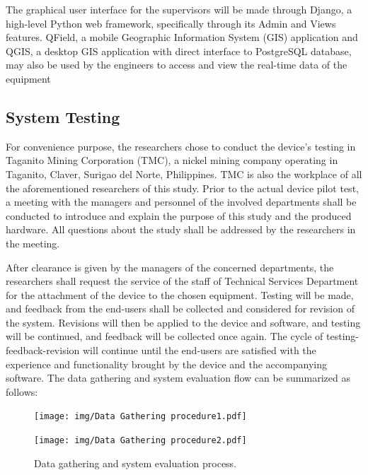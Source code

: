 \documentclass[12pt]{report}
\begin{document}
The graphical user interface for the supervisors will be made through Django, a high-level Python web framework, specifically through its Admin and Views features.
QField, a mobile Geographic Information System (GIS) application and QGIS, a desktop GIS application with direct interface to PostgreSQL database, may also be used by the engineers to access and view the real-time data of the equipment 

\subsection{System Testing}

For convenience purpose, the researchers chose to conduct the device's testing in Taganito Mining Corporation (TMC), a nickel mining company operating in Taganito, Claver, Surigao del Norte, Philippines.
TMC is also the workplace of all the aforementioned researchers of this study. 
Prior to the actual device pilot test, a meeting with the managers and personnel of the involved departments shall be conducted to introduce and explain the purpose of this study and the produced hardware. 
All questions about the study shall be addressed by the researchers in the meeting.

After clearance is given by the managers of the concerned departments, the researchers shall request the service of the staff of Technical Services Department for the attachment of the device to the chosen equipment.
Testing will be made, and feedback from the end-users shall be collected and considered for revision of the system.
Revisions will then be applied to the device and software, and testing will be continued, and feedback will be collected once again.
The cycle of testing-feedback-revision will continue until the end-users are satisfied with the experience and functionality brought by the device and the accompanying software.
The data gathering and system evaluation flow can be summarized as follows:

\begin{figure}[H]
    \centering
    \texttt{[image: img/Data Gathering procedure1.pdf]}
\end{figure}

\begin{figure}[H]
    \centering
    \texttt{[image: img/Data Gathering procedure2.pdf]}
    \caption{Data gathering and system evaluation process.}
    \label{fig:Data Gathering procedure2.pdf}
\end{figure}
\end{document}
